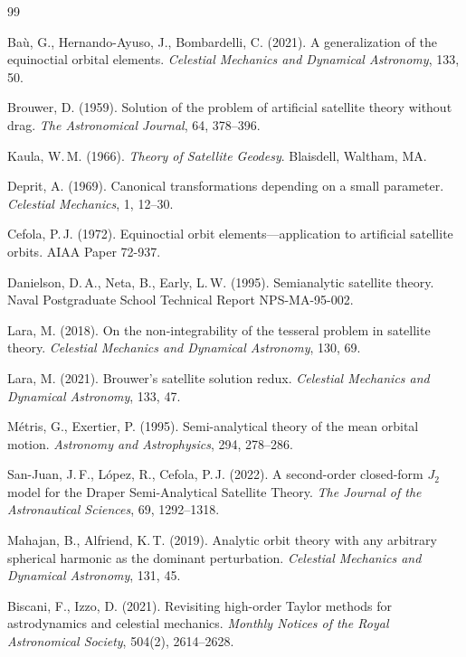 \documentclass[11pt]{article}
\begin{document}
\begin{thebibliography}{99}

Ba\`u, G., Hernando-Ayuso, J., Bombardelli, C. (2021).
A generalization of the equinoctial orbital elements.
\textit{Celestial Mechanics and Dynamical Astronomy}, 133, 50.

Brouwer, D. (1959).
Solution of the problem of artificial satellite theory without drag.
\textit{The Astronomical Journal}, 64, 378--396.

Kaula, W.\,M. (1966).
\textit{Theory of Satellite Geodesy}.
Blaisdell, Waltham, MA.

Deprit, A. (1969).
Canonical transformations depending on a small parameter.
\textit{Celestial Mechanics}, 1, 12--30.

Cefola, P.\,J. (1972).
Equinoctial orbit elements---application to artificial satellite orbits.
AIAA Paper 72-937.

Danielson, D.\,A., Neta, B., Early, L.\,W. (1995).
Semianalytic satellite theory.
Naval Postgraduate School Technical Report NPS-MA-95-002.

Lara, M. (2018).
On the non-integrability of the tesseral problem in satellite theory.
\textit{Celestial Mechanics and Dynamical Astronomy}, 130, 69.

Lara, M. (2021).
Brouwer's satellite solution redux.
\textit{Celestial Mechanics and Dynamical Astronomy}, 133, 47.

M\'etris, G., Exertier, P. (1995).
Semi-analytical theory of the mean orbital motion.
\textit{Astronomy and Astrophysics}, 294, 278--286.

San-Juan, J.\,F., L\'opez, R., Cefola, P.\,J. (2022).
A second-order closed-form $J_2$ model for the Draper
Semi-Analytical Satellite Theory.
\textit{The Journal of the Astronautical Sciences}, 69, 1292--1318.

Mahajan, B., Alfriend, K.\,T. (2019).
Analytic orbit theory with any arbitrary spherical harmonic as the
dominant perturbation.
\textit{Celestial Mechanics and Dynamical Astronomy}, 131, 45.

Biscani, F., Izzo, D. (2021).
Revisiting high-order Taylor methods for astrodynamics and celestial
mechanics.
\textit{Monthly Notices of the Royal Astronomical Society}, 504(2),
2614--2628.

\end{thebibliography}
\end{document}

